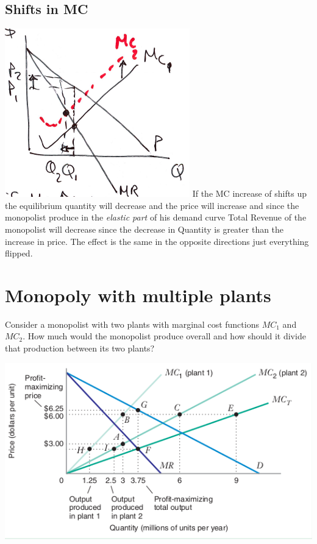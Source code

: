 \documentclass[../ECON-281-Notes.tex]{subfiles}
\begin{document}
\subsection{Shifts in MC}
\includegraphics[width=\columnwidth]{assets/image_2021-11-29-22-54-08.png}
If the MC increase of shifts up the equilibrium quantity will decrease and the price will increase and since the monopolist produce in the \emph{elastic part} of his demand curve Total Revenue of the monopolist will decrease since the decrease in Quantity is greater than the increase in price.
The effect is the same in the opposite directions just everything flipped.



\section{Monopoly with multiple plants}
Consider a monopolist with two plants with marginal cost functions $MC_1$ and $MC_2$. 
How much would the monopolist produce overall and how should it divide that production between its two plants?

\includegraphics[width=\columnwidth]{assets/image_2021-11-29-23-01-08.png}
\end{document}
